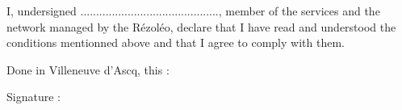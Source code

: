 \documentclass[12pt]{article}
\begin{document}
\vspace*{0.5cm}

I, undersigned ............................................, member of the services and the network managed by the Rézoléo, declare that I have read and understood the conditions mentionned above and that I agree to comply with them.

\vspace*{0.5cm}

\hspace{2cm} Done in Villeneuve d'Ascq, this : \dotfill


\hspace{2cm} Signature :
\end{document}
